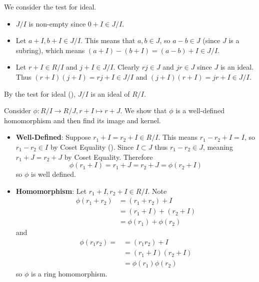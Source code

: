 \begin{questions}
    \item \begin{partquestions}{\roman*}
        \item We consider the test for ideal.
        \begin{itemize}
            \item $J/I$ is non-empty since $0+I \in J/I$.
            \item Let $a+I,b+I \in J/I$. This means that $a,b \in J$, so $a - b \in J$ (since $J$ is a subring), which means $(a+I) - (b+I) = (a-b) + I \in J/I$.
            \item Let $r+I \in R/I$ and $j+I \in J/I$. Clearly $rj \in J$ and $jr \in J$ since $J$ is an ideal. Thus $(r+I)(j+I) = rj + I \in J/I$ and $(j+I)(r+I) = jr + I \in J/I$.
        \end{itemize}
        By the test for ideal (), $J/I$ is an ideal of $R/I$.
    
        \item Consider $\phi: R/I \to R/J, r+I\mapsto r+J$. We show that $\phi$ is a well-defined homomorphism and then find its image and kernel.
        \begin{itemize}
            \item \textbf{Well-Defined}: Suppose $r_1 + I = r_2 + I \in R/I$. This means $r_1 - r_2 + I = I$, so $r_1 - r_2 \in I$ by Coset Equality (). Since $I \subset J$ thus $r_1 - r_2 \in J$, meaning $r_1 + J = r_2 + J$ by Coset Equality. Therefore
            \[
                \phi(r_1 + I) = r_1 + J = r_2 + J = \phi(r_2 + I)
            \]
            so $\phi$ is well defined.
    
            \item \textbf{Homomorphism}: Let $r_1 + I, r_2 + I \in R/I$. Note
            \begin{align*}
                \phi(r_1+r_2) &= (r_1+r_2) + I\\
                &= (r_1+I) + (r_2+I)\\
                &= \phi(r_1) + \phi(r_2)
            \end{align*}
            and
            \begin{align*}
                \phi(r_1r_2) = &= (r_1r_2) + I\\
                &= (r_1+I)(r_2+I)\\
                &= \phi(r_1)\phi(r_2)
            \end{align*}
            so $\phi$ is a ring homomorphism.
    

\end{itemize}
\end{partquestions}
\end{questions}
